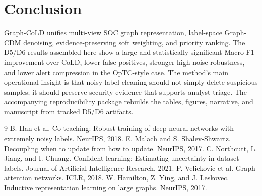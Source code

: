 \documentclass[11pt]{article}
\begin{document}
\section{Conclusion}
Graph-CoLD unifies multi-view SOC graph representation, label-space Graph-CDM denoising, evidence-preserving soft weighting, and priority ranking. The D5/D6 results assembled here show a large and statistically significant Macro-F1 improvement over CoLD, lower false positives, stronger high-noise robustness, and lower alert compression in the OpTC-style case. The method's main operational insight is that noisy-label cleaning should not simply delete suspicious samples; it should preserve security evidence that supports analyst triage. The accompanying reproducibility package rebuilds the tables, figures, narrative, and manuscript from tracked D5/D6 artifacts.

\begin{thebibliography}{9}
 B. Han et al. Co-teaching: Robust training of deep neural networks with extremely noisy labels. NeurIPS, 2018.
 E. Malach and S. Shalev-Shwartz. Decoupling when to update from how to update. NeurIPS, 2017.
 C. Northcutt, L. Jiang, and I. Chuang. Confident learning: Estimating uncertainty in dataset labels. Journal of Artificial Intelligence Research, 2021.
 P. Velickovic et al. Graph attention networks. ICLR, 2018.
 W. Hamilton, Z. Ying, and J. Leskovec. Inductive representation learning on large graphs. NeurIPS, 2017.
\end{thebibliography}
\end{document}
